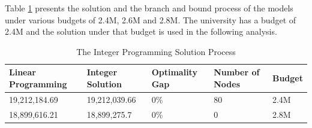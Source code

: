 \documentclass[12pt,english]{report}
\begin{document}
Table \ref{IPSolution}  presents the solution and the branch and bound process of the models under various budgets of 2.4M, 2.6M and 2.8M.  The university has a budget of 2.4M and the solution under that budget is used in the following analysis. 
\begin{table}[ht]
\centering
\caption{The Integer Programming Solution Process}
\label{IPSolution}
\begin{tabular}{|l|l|l|l|l|} \hline
Linear Programming & Integer Solution & Optimality Gap & Number of Nodes & Budget  \\ \hline
              19,212,184.69     & 19,212,039.66    &   0\%            &     80        &  2.4M\\ \hline
                18,899,616.21   &    18,899,275.7          &    0\%           &     0        &  2.8M \\ \hline
\end{tabular}
\end{table}

\end{document}
